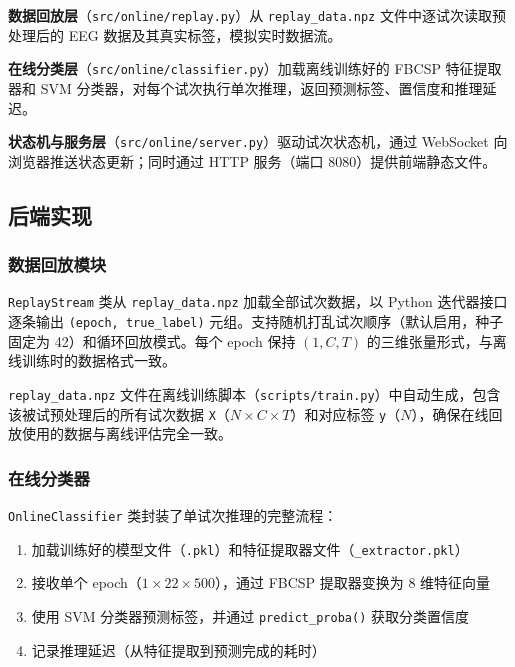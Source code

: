 \textbf{数据回放层}（\texttt{src/online/replay.py}）从 \texttt{replay\_data.npz} 文件中逐试次读取预处理后的 EEG 数据及其真实标签，模拟实时数据流。

\textbf{在线分类层}（\texttt{src/online/classifier.py}）加载离线训练好的 FBCSP 特征提取器和 SVM 分类器，对每个试次执行单次推理，返回预测标签、置信度和推理延迟。

\textbf{状态机与服务层}（\texttt{src/online/server.py}）驱动试次状态机，通过 WebSocket 向浏览器推送状态更新；同时通过 HTTP 服务（端口 8080）提供前端静态文件。

\subsection{后端实现}
\label{sec:online-backend}

\subsubsection{数据回放模块}

\texttt{ReplayStream} 类从 \texttt{replay\_data.npz} 加载全部试次数据，以 Python 迭代器接口逐条输出 \texttt{(epoch, true\_label)} 元组。支持随机打乱试次顺序（默认启用，种子固定为 42）和循环回放模式。每个 epoch 保持 $(1, C, T)$ 的三维张量形式，与离线训练时的数据格式一致。

\texttt{replay\_data.npz} 文件在离线训练脚本（\texttt{scripts/train.py}）中自动生成，包含该被试预处理后的所有试次数据 \texttt{X}（$N \times C \times T$）和对应标签 \texttt{y}（$N$），确保在线回放使用的数据与离线评估完全一致。

\subsubsection{在线分类器}

\texttt{OnlineClassifier} 类封装了单试次推理的完整流程：

\begin{enumerate}[leftmargin=2em]
	\item 加载训练好的模型文件（\texttt{.pkl}）和特征提取器文件（\texttt{\_extractor.pkl}）
	\item 接收单个 epoch（$1 \times 22 \times 500$），通过 FBCSP 提取器变换为 8 维特征向量
	\item 使用 SVM 分类器预测标签，并通过 \texttt{predict\_proba()} 获取分类置信度
	\item 记录推理延迟（从特征提取到预测完成的耗时）
\end{enumerate}

